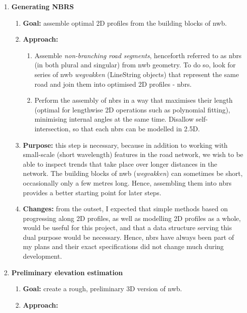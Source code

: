 \begin{enumerate}
    \item \textbf{Generating NBRS}
    \begin{enumerate}
        \item \textbf{Goal:} assemble optimal 2D profiles from the building blocks of \ac{nwb}.
        \item \textbf{Approach:}
        \begin{enumerate}
            \item Assemble \textit{non-branching road segments}, henceforth referred to as \ac{nbrs} (in both plural and singular) from \ac{nwb} geometry. To do so, look for series of \ac{nwb} \textit{wegvakken} (LineString objects) that represent the same road and join them into optimised 2D profiles - \ac{nbrs}.
            \item Perform the assembly of \ac{nbrs} in a way that maximises their length (optimal for lengthwise 2D operations such as polynomial fitting), minimising internal angles at the same time. Disallow self-intersection, so that each \ac{nbrs} can be modelled in 2.5D.
        \end{enumerate}
        \item \textbf{Purpose:} this step is necessary, because in addition to working with small-scale (short wavelength) features in the road network, we wish to be able to inspect trends that take place over longer distances in the network. The building blocks of \ac{nwb} (\textit{wegvakken}) can sometimes be short, occasionally only a few metres long. Hence, assembling them into \ac{nbrs} provides a better starting point for later steps.
        \item \textbf{Changes:} from the outset, I expected that simple methods based on progressing along 2D profiles, as well as modelling 2D profiles as a whole, would be useful for this project, and that a data structure serving this dual purpose would be necessary. Hence, \ac{nbrs} have always been part of my plans and their exact specifications did not change much during development.
    \end{enumerate}
    \item \textbf{Preliminary elevation estimation}
    \begin{enumerate}
        \item \textbf{Goal:} create a rough, preliminary 3D version of \ac{nwb}.
        \item \textbf{Approach:}
        \begin{enumerate}

\end{enumerate}
\end{enumerate}
\end{enumerate}
